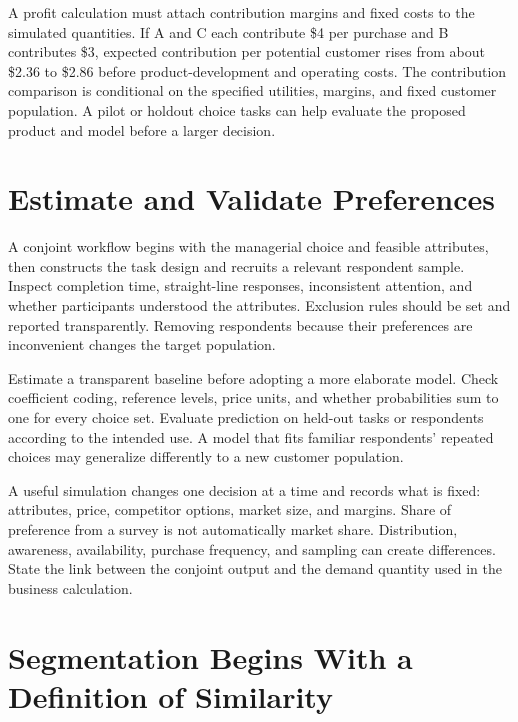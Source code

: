 A profit calculation must attach contribution margins and fixed costs to
the simulated quantities. If A and C each contribute \$4 per purchase
and B contributes \$3, expected contribution per potential customer
rises from about \$2.36 to \$2.86 before product-development and
operating costs. The contribution comparison is conditional on the
specified utilities, margins, and fixed customer population. A pilot or
holdout choice tasks can help evaluate the proposed product and model
before a larger decision.

\hypertarget{M04-estimate-and-validate-preferences}{%
\section{Estimate and Validate
Preferences}\label{M04-estimate-and-validate-preferences}}

\noindent A conjoint workflow begins with the managerial choice and feasible
attributes, then constructs the task design and recruits a relevant
respondent sample. Inspect completion time, straight-line responses,
inconsistent attention, and whether participants understood the
attributes. Exclusion rules should be set and reported transparently.
Removing respondents because their preferences are inconvenient changes
the target population.

Estimate a transparent baseline before adopting a more elaborate model.
Check coefficient coding, reference levels, price units, and whether
probabilities sum to one for every choice set. Evaluate prediction on
held-out tasks or respondents according to the intended use. A model
that fits familiar respondents' repeated choices may generalize
differently to a new customer population.

A useful simulation changes one decision at a time and records what is
fixed: attributes, price, competitor options, market size, and margins.
Share of preference from a survey is not automatically market share.
Distribution, awareness, availability, purchase frequency, and sampling
can create differences. State the link between the conjoint output and
the demand quantity used in the business calculation.

\hypertarget{M04-segmentation-begins-with-a-definition-of-similarity}{%
\section{Segmentation Begins With a Definition of
Similarity}\label{M04-segmentation-begins-with-a-definition-of-similarity}}

